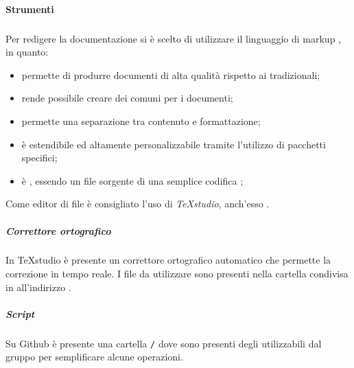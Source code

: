 \paragraph{Strumenti}
	\subparagraph{\gl{\LaTeX}}
	Per redigere la documentazione si è scelto di utilizzare il linguaggio di markup \gl{\LaTeX}, in quanto: \\
	\begin{itemize} 
		\item permette di produrre documenti di alta qualità rispetto ai  tradizionali; 
		\item rende possibile creare dei  comuni per i documenti;
		\item permette una separazione tra contenuto e formattazione;
		\item è estendibile ed altamente personalizzabile tramite l'utilizzo di pacchetti specifici;
		\item è , essendo un file sorgente di \gl{\LaTeX} una semplice codifica ;
		\end{itemize}
		Come editor di file  è consigliato l'uso di \textit{TeXstudio}, anch'esso .	
	\subparagraph{Correttore ortografico}
	In TeXstudio è presente un correttore ortografico automatico che permette la correzione in tempo reale. I file da utilizzare sono presenti nella cartella condivisa in  all'indirizzo .
	\subparagraph{Script}
		Su Github è presente una cartella \texttt{/} dove sono presenti degli  utilizzabili dal gruppo per semplificare alcune operazioni.